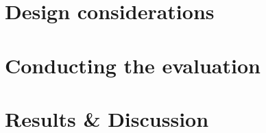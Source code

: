 
\chapter{Design considerations}
\chapter{Conducting the evaluation}
\chapter{Results \& Discussion}